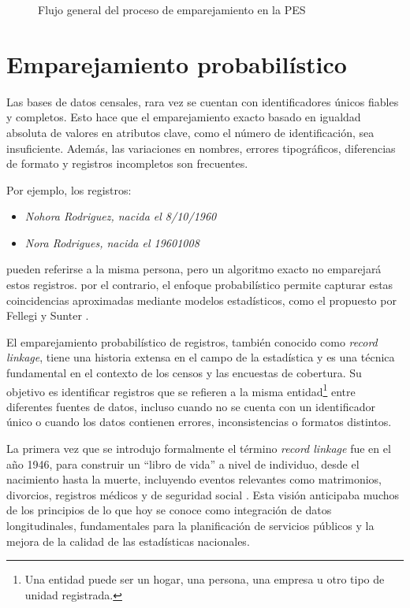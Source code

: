 \documentclass[
  12pt,
]{book}
\providecommand{\tightlist}{%
  \setlength{\itemsep}{0pt}\setlength{\parskip}{0pt}}
\begin{document}
\begin{figure}
{}

\caption{Flujo general del proceso de emparejamiento en la PES}\label{fig:match1q}
\end{figure}

\section{Emparejamiento probabilístico}\label{emparejamiento-probabiluxedstico}

Las bases de datos censales, rara vez se cuentan con identificadores únicos fiables y completos. Esto hace que el emparejamiento exacto basado en igualdad absoluta de valores en atributos clave, como el número de identificación, sea insuficiente. Además, las variaciones en nombres, errores tipográficos, diferencias de formato y registros incompletos son frecuentes.

Por ejemplo, los registros:

\begin{itemize}
\tightlist
\item
  \emph{Nohora Rodriguez, nacida el 8/10/1960}
\item
  \emph{Nora Rodrigues, nacida el 19601008}
\end{itemize}

pueden referirse a la misma persona, pero un algoritmo exacto no emparejará estos registros. por el contrario, el enfoque probabilístico permite capturar estas coincidencias aproximadas mediante modelos estadísticos, como el propuesto por Fellegi y Sunter \citep{fellegi1969theory}.

El emparejamiento probabilístico de registros, también conocido como \emph{record linkage}, tiene una historia extensa en el campo de la estadística y es una técnica fundamental en el contexto de los censos y las encuestas de cobertura. Su objetivo es identificar registros que se refieren a la misma entidad\footnote{Una entidad puede ser un hogar, una persona, una empresa u otro tipo de unidad registrada.} entre diferentes fuentes de datos, incluso cuando no se cuenta con un identificador único o cuando los datos contienen errores, inconsistencias o formatos distintos.

La primera vez que se introdujo formalmente el término \emph{record linkage} fue en el año 1946, para construir un ``libro de vida'' a nivel de individuo, desde el nacimiento hasta la muerte, incluyendo eventos relevantes como matrimonios, divorcios, registros médicos y de seguridad social \citep{dunn1946}. Esta visión anticipaba muchos de los principios de lo que hoy se conoce como integración de datos longitudinales, fundamentales para la planificación de servicios públicos y la mejora de la calidad de las estadísticas nacionales.
\end{document}
